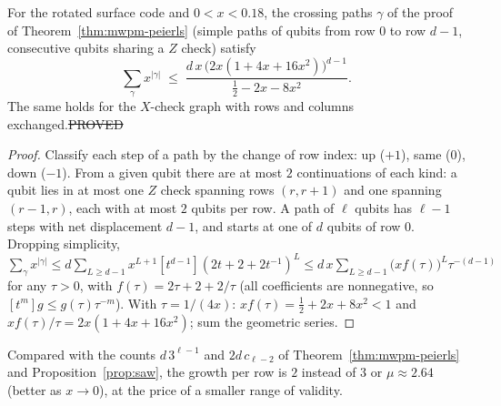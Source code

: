 \begin{lemma}\label{lem:row-count}
For the rotated surface code and $0<x<0.18$, the crossing paths $\gamma$ of the proof of Theorem~\ref{thm:mwpm-peierls} (simple paths of qubits from row $0$ to row $d-1$, consecutive qubits sharing a $Z$ check) satisfy
\[
\sum_\gamma x^{|\gamma|}\;\le\;\frac{d\,x\,\big(2x(1+4x+16x^2)\big)^{d-1}}{\tfrac12-2x-8x^2}.
\]
The same holds for the $X$-check graph with rows and columns exchanged.\hfill\st{PROVED}
\end{lemma}
\begin{proof}
Classify each step of a path by the change of row index: up ($+1$), same ($0$), down ($-1$). From a given qubit there are at most $2$ continuations of each kind: a qubit lies in at most one $Z$ check spanning rows $(r,r+1)$ and one spanning $(r-1,r)$, each with at most $2$ qubits per row. A path of $\ell$ qubits has $\ell-1$ steps with net displacement $d-1$, and starts at one of $d$ qubits of row $0$. Dropping simplicity,
$\sum_\gamma x^{|\gamma|}\le d\sum_{L\ge d-1}x^{L+1}[t^{d-1}](2t+2+2t^{-1})^L\le d\,x\sum_{L\ge d-1}\big(xf(\tau)\big)^L\tau^{-(d-1)}$
for any $\tau>0$, with $f(\tau)=2\tau+2+2/\tau$ (all coefficients are nonnegative, so $[t^m]g\le g(\tau)\tau^{-m}$). With $\tau=1/(4x)$: $xf(\tau)=\tfrac12+2x+8x^2<1$ and $xf(\tau)/\tau=2x(1+4x+16x^2)$; sum the geometric series.
\end{proof}

\noindent Compared with the counts $d\,3^{\ell-1}$ and $2d\,c_{\ell-2}$ of Theorem~\ref{thm:mwpm-peierls} and Proposition~\ref{prop:saw}, the growth per row is $2$ instead of $3$ or $\mu\approx2.64$ (better as $x\to0$), at the price of a smaller range of validity.

